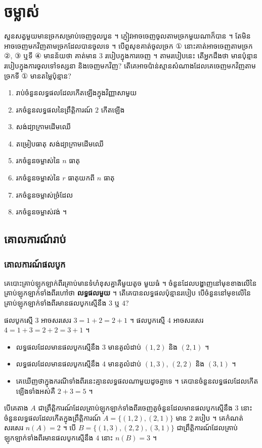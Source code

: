 \chapter{ចម្លាស់}

\begin{note}[ជំពូកទី ៦ ៖ ចម្លាស់ បន្សំ និងប្រូបាប]
សួនសត្វមួយមានច្រកសម្រាប់ចេញចូលបួន ។ ភ្ញៀវអាចចេញចូលតាមច្រកមួយណាក៏បាន ។ តែមិនអាចចេញមកវិញតាមច្រកដែលបានចូលទេ ។ បើពួសុខគាត់ចូលច្រក ① នោះគាត់អាចចេញតាមច្រក ②, ③ ឬទី ④ មានន័យថា គាត់មាន $3$ របៀបក្នុងការចេញ ។ តាមរបៀបនេះ តើអ្នកដឹងថា មានប៉ុន្មានរបៀបក្នុងការចូលទៅទស្សនា និងចេញមកវិញ? តើគេអាចប៉ាន់ស្មានសំណាងដែលគេចេញមកវិញតាមច្រកទី ① មានតម្លៃប៉ុន្មាន?
\end{note}

\begin{objBox}[វត្ថុបំណង]
\begin{enumerate}[1]
  \item រាប់ចំនួនលទ្ធផលដែលកើតឡើងក្នុងវិញ្ញាសាមួយ
  \item រកចំនួនលទ្ធផលនៃព្រឹត្តិការណ៍ $2$ កើតឡើង
  \item សង់ដ្យាក្រាមដើមឈើ
  \item តម្រៀបធាតុ សង់ដ្យាក្រាមដើមឈើ
  \item រកចំនួនចម្លាស់នៃ $n$ ធាតុ
  \item រកចំនួនចម្លាស់នៃ $r$ ធាតុយកពី $n$ ធាតុ
  \item រកចំនួនចម្លាស់ច្រំដែល
  \item រកចំនួនចម្លាស់វង់ ។
\end{enumerate}
\end{objBox}

\section{គោលការណ៍រាប់}
\subsection{គោលការណ៍ផលបូក}

\begin{example}[ឧទាហរណ៍ ១]
គេបោះគ្រាប់ឡុកឡាក់ពីរគ្រាប់មានទំហំខុសគ្នាគឺមួយតូច មួយធំ ។ ចំនួនដែលបង្ហាញនៅមុខខាងលើនៃគ្រាប់ឡុកឡាក់ទាំងពីរហៅថា \textbf{លទ្ធផលមួយ} ។ តើគេបានលទ្ធផលប៉ុន្មានរបៀប បើចំនួននៅមុខលើនៃគ្រាប់ឡុកឡាក់ទាំងពីរមានផលបូកស្មើនឹង $3$ ឬ $4$?
\end{example}
ផលបូកស្មើ $3$ អាចសរសេរ $3 = 1 + 2 = 2 + 1$ ។ ផលបូកស្មើ $4$ អាចសរសេរ $4 = 1 + 3 = 2 + 2 = 3 + 1$ ។
\begin{itemize}
  \item លទ្ធផលដែលមានផលបូកស្មើនឹង $3$ មានគូលំដាប់ $(1, 2)$ និង $(2, 1)$ ។
  \item លទ្ធផលដែលមានផលបូកស្មើនឹង $4$ មានគូលំដាប់ $(1, 3)$, $(2, 2)$ និង $(3, 1)$ ។
  \item គេឃើញថាក្នុងករណីទាំងពីរនេះគ្មានលទ្ធផលណាមួយដូចគ្នាទេ ។ គេបានចំនួនលទ្ធផលដែលកើតឡើងទាំងអស់គឺ $2 + 3 = 5$ ។
\end{itemize}
បើគេតាង $A$ ជាព្រឹត្តិការណ៍ដែលគ្រាប់ឡុកឡាក់ទាំងពីរចេញគូចំនួនដែលមានផលបូកស្មើនឹង $3$ នោះចំនួនលទ្ធផលដែលកើតក្នុងព្រឹត្តិការណ៍ $A = \{(1, 2), (2, 1)\}$ មាន $2$ របៀប ។ គេកំណត់សរសេរ $n(A) = 2$ ។ បើ $B = \{(1, 3), (2, 2), (3, 1)\}$ ជាព្រឹត្តិការណ៍ដែលគ្រាប់ឡុកឡាក់ទាំងពីរមានផលបូកស្មើនឹង $4$ នោះ $n(B) = 3$ ។


